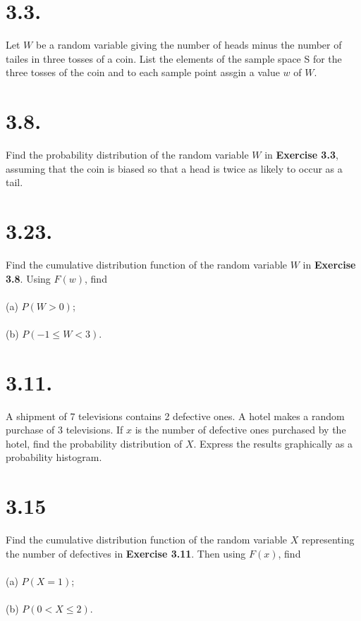 \documentclass[../main.tex]{subfiles}
\begin{document}
\section{3.3.}

Let $W$ be a random variable giving the number of heads minus the number
of tailes in three tosses of a coin. List the elements of the sample space S
for the three tosses of the coin and to each sample point assgin
a value $w$ of $W$.

\vspace{15em}

\section{3.8.}
Find the probability distribution of the random variable $W$ in \textbf{Exercise 3.3},
assuming that the coin is biased so that a head is twice as likely to occur as a tail.

\vspace{20em}

\section{3.23.}
Find the cumulative distribution function of the random variable
$W$ in \textbf{Exercise 3.8}. Using $F(w)$, find
\\\\
(a) $P(W>0)$;
\\\\
(b) $P(-1\leq W < 3)$.

\vspace{15em}

\section{3.11.}
A shipment of 7 televisions contains 2 defective ones. A hotel makes
a random purchase of 3 televisions. If $x$ is the number of defective ones
purchased by the hotel, find the probability distribution of $X$.
Express the results graphically as a probability histogram.

\vspace{15em}

\section{3.15}
Find the cumulative distribution function of the random variable $X$ representing 
the number of defectives in \textbf{Exercise 3.11}. Then using $F(x)$, find
\\\\
(a) $P(X=1)$;
\\\\
(b) $P(0<X\leq 2)$.
\end{document}
